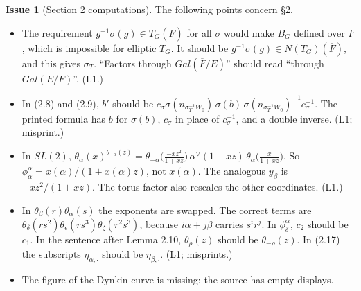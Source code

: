 \documentclass[12pt,letterpaper]{article}
\newcommand{\ovF}{\overline{F}}
\newcommand{\Lv}[1]{\textsf{L#1}}
\theoremstyle{definition}
\newtheorem{issue}{Issue}[section]
\begin{document}
\begin{issue}[Section 2 computations]\label{iss:sec2}
The following points concern \S2.
\begin{itemize}
\item The requirement $g^{-1}\sigma(g)\in T_G(\ovF)$ for all $\sigma$ would
make $B_G$ defined over $F$, which is impossible for elliptic $T_G$. It should
be $g^{-1}\sigma(g)\in N(T_G)(\ovF)$, and this gives $\sigma_T$. ``Factors
through $Gal(\ovF/E)$'' should read ``through $Gal(E/F)$''. (\Lv{1}.)
\item In (2.8) and (2.9), $b'$ should be
$c_\sigma\sigma(n_{\sigma_T^{-1}W_0})\,\sigma(b)\,\sigma(n_{\sigma_T^{-1}W_0})^{-1}c_\sigma^{-1}$.
The printed formula has $b$ for $\sigma(b)$, $c_\sigma$ in place of
$c_\sigma^{-1}$, and a double inverse. (\Lv{1}; misprint.)
\item In $SL(2)$, $\theta_\alpha(x)^{\theta_{-\alpha}(z)}=\theta_{-\alpha}\!\big(\tfrac{-xz^2}{1+xz}\big)\,\alpha^\vee(1+xz)\,\theta_\alpha\!\big(\tfrac{x}{1+xz}\big)$.
So $\phi^\alpha_\alpha=x(\alpha)/(1+x(\alpha)z)$, not $x(\alpha)$. The
analogous $y_\beta$ is $-xz^2/(1+xz)$. The torus factor also rescales the
other coordinates. (\Lv{1}.)
\item In $\theta_\beta(r)\theta_\alpha(s)$ the exponents are swapped. The
correct terms are $\theta_\delta(rs^2)\theta_\epsilon(rs^3)\theta_\zeta(r^2s^3)$,
because $i\alpha+j\beta$ carries $s^ir^j$. In $\phi^\alpha_\delta$, $c_2$
should be $c_1$. In the sentence after Lemma 2.10, $\theta_\rho(z)$ should be
$\theta_{-\rho}(z)$. In (2.17) the subscripts $\eta_{\alpha,\cdot}$ should be
$\eta_{\beta,\cdot}$. (\Lv{1}; misprints.)
\item The figure of the Dynkin curve is missing: the source has empty displays.
\end{itemize}
\end{issue}
\end{document}
